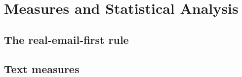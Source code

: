 \chapter{Measures and Statistical Analysis}
\label{ch:measures}

\section{The real-email-first rule}


\section{Text measures}





